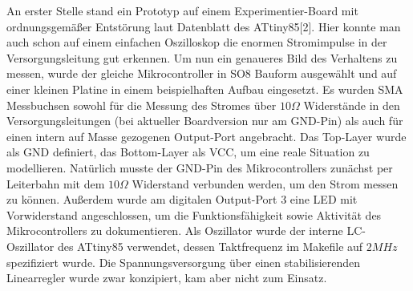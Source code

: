 \documentclass[a4paper,10pt, twocolumn]{article}
\begin{document}
An erster Stelle stand ein Prototyp auf einem Experimentier-Board 
mit ordnungsgemäßer Entstörung laut Datenblatt des ATtiny85[2]. Hier konnte man 
auch schon auf einem einfachen Oszilloskop die enormen Stromimpulse in der
Versorgungsleitung gut erkennen. Um nun ein genaueres Bild des Verhaltens zu 
messen, wurde der gleiche Mikrocontroller in SO8 Bauform ausgewählt und 
auf einer kleinen Platine in einem beispielhaften Aufbau eingesetzt.
\newline 
Es wurden SMA Messbuchsen sowohl für die Messung des Stromes über 
$10\Omega$ Widerstände in den Versorgungsleitungen (bei aktueller Boardversion 
nur am GND-Pin) als auch für einen intern 
auf Masse gezogenen Output-Port angebracht. Das Top-Layer wurde als 
GND definiert, das 
Bottom-Layer als VCC, um eine reale Situation zu modellieren. Natürlich musste 
der GND-Pin des Mikrocontrollers zunächst per Leiterbahn mit dem $10\Omega$
Widerstand verbunden werden, um den Strom messen zu können. Außerdem wurde am 
digitalen Output-Port 3 eine LED mit Vorwiderstand angeschlossen, um die 
Funktionsfähigkeit sowie 
Aktivität des Mikrocontrollers zu dokumentieren. 
Als Oszillator wurde der interne LC-Oszillator des ATtiny85 verwendet, 
dessen Taktfrequenz im Makefile auf $2MHz$ spezifiziert wurde.
Die Spannungsversorgung über einen stabilisierenden Linearregler wurde zwar 
konzipiert, kam aber nicht zum Einsatz.
\end{document}
